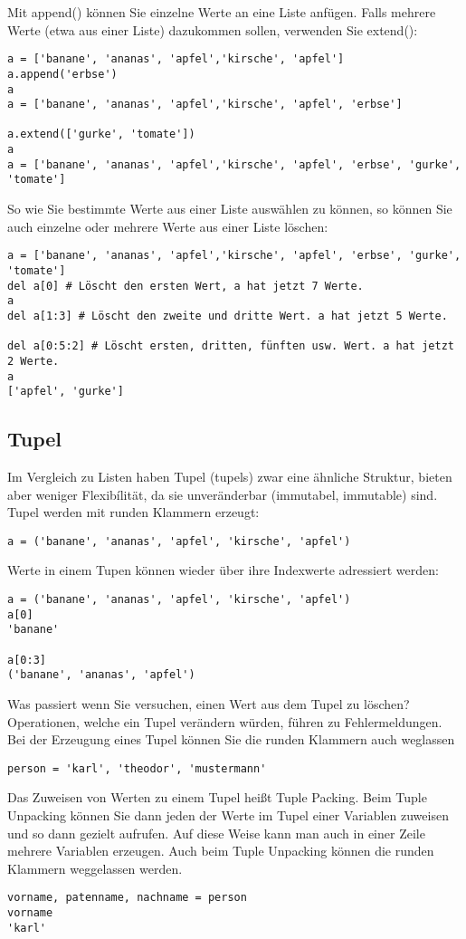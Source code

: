 \documentclass{article}
\begin{document}
\newpage

Mit append() können Sie einzelne Werte an eine Liste anfügen. Falls mehrere Werte (etwa aus einer Liste) dazukommen sollen, verwenden Sie extend():\\
\begin{verbatim}
a = ['banane', 'ananas', 'apfel','kirsche', 'apfel']
a.append('erbse')
a
a = ['banane', 'ananas', 'apfel','kirsche', 'apfel', 'erbse']

a.extend(['gurke', 'tomate'])
a
a = ['banane', 'ananas', 'apfel','kirsche', 'apfel', 'erbse', 'gurke', 'tomate']
\end{verbatim}
So wie Sie bestimmte Werte aus einer Liste auswählen zu können, so können Sie auch einzelne oder mehrere Werte aus einer Liste löschen:\\
\begin{verbatim}
a = ['banane', 'ananas', 'apfel','kirsche', 'apfel', 'erbse', 'gurke', 'tomate']
del a[0] # Löscht den ersten Wert, a hat jetzt 7 Werte.
a
del a[1:3] # Löscht den zweite und dritte Wert. a hat jetzt 5 Werte.

del a[0:5:2] # Löscht ersten, dritten, fünften usw. Wert. a hat jetzt 2 Werte.
a
['apfel', 'gurke']
\end{verbatim}

\subsection{Tupel}
Im Vergleich zu Listen haben Tupel (tupels) zwar eine ähnliche Struktur, bieten aber weniger Flexibílität, da sie unveränderbar (immutabel, immutable) sind. Tupel werden mit runden Klammern erzeugt:\\
\begin{verbatim}
a = ('banane', 'ananas', 'apfel', 'kirsche', 'apfel')
\end{verbatim}
Werte in einem Tupen können wieder über ihre Indexwerte adressiert werden:
\begin{verbatim}
a = ('banane', 'ananas', 'apfel', 'kirsche', 'apfel')
a[0]
'banane'

a[0:3]
('banane', 'ananas', 'apfel')
\end{verbatim}
Was passiert wenn Sie versuchen, einen Wert aus dem Tupel zu löschen?\\
Operationen, welche ein Tupel verändern würden, führen zu Fehlermeldungen.\\
Bei der Erzeugung eines Tupel können Sie die runden Klammern auch weglassen\\
\begin{verbatim}
person = 'karl', 'theodor', 'mustermann'
\end{verbatim}
Das Zuweisen von Werten zu einem Tupel heißt Tuple Packing. Beim Tuple Unpacking können Sie dann jeden der Werte im Tupel einer Variablen zuweisen und so dann gezielt aufrufen. Auf diese Weise kann man auch in einer Zeile mehrere Variablen erzeugen. Auch beim Tuple Unpacking können die runden Klammern weggelassen werden.\\
\begin{verbatim}
vorname, patenname, nachname = person
vorname
'karl'
\end{verbatim}
\end{document}
